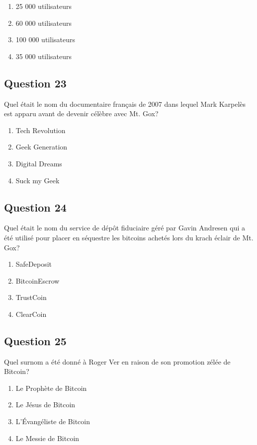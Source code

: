 \documentclass[12pt,a4paper]{article}
\begin{document}
\begin{enumerate}[label=\Alph*., leftmargin=*]
\item 25 000 utilisateurs
\item 60 000 utilisateurs
\item 100 000 utilisateurs
\item 35 000 utilisateurs
\end{enumerate}

\bigskip


\subsection*{Question 23}
Quel était le nom du documentaire français de 2007 dans lequel Mark Karpelès est apparu avant de devenir célèbre avec Mt. Gox?

\begin{enumerate}[label=\Alph*., leftmargin=*]
\item Tech Revolution
\item Geek Generation
\item Digital Dreams
\item Suck my Geek
\end{enumerate}

\bigskip


\subsection*{Question 24}
Quel était le nom du service de dépôt fiduciaire géré par Gavin Andresen qui a été utilisé pour placer en séquestre les bitcoins achetés lors du krach éclair de Mt. Gox?

\begin{enumerate}[label=\Alph*., leftmargin=*]
\item SafeDeposit
\item BitcoinEscrow
\item TrustCoin
\item ClearCoin
\end{enumerate}

\bigskip


\subsection*{Question 25}
Quel surnom a été donné à Roger Ver en raison de son promotion zélée de Bitcoin?

\begin{enumerate}[label=\Alph*., leftmargin=*]
\item Le Prophète de Bitcoin
\item Le Jésus de Bitcoin
\item L'Évangéliste de Bitcoin
\item Le Messie de Bitcoin
\end{enumerate}
\end{document}
